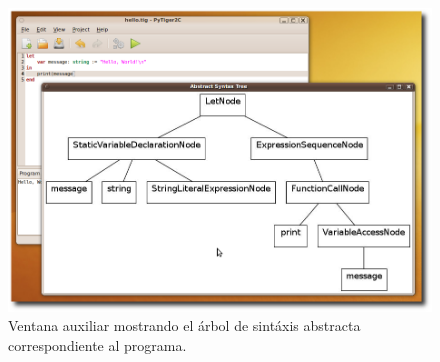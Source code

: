 \documentclass{article}
\begin{document}
\begin{figure}[htb]
  \centering
  \includegraphics[width=6.5in]{gui/13-ast-viewer}
  \caption{Ventana auxiliar mostrando el árbol de sintáxis abstracta
    correspondiente al programa.}
  \label{fig:13-ast-viewer}
\end{figure}
\end{document}
